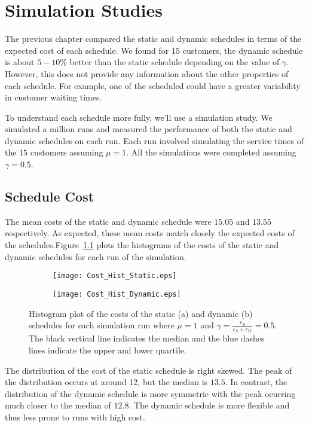 \chapter{Simulation Studies}
The previous chapter compared the static and dynamic schedules in terms of the expected cost of each schedule. We found for $15$ customers, the dynamic schedule is about $5 - 10 \%$ better than the static schedule depending on the value of $\gamma$. However, this does not provide any information about the other properties of each schedule. For example, one of the scheduled could have a greater variability in customer waiting times.

To understand each schedule more fully, we'll use a simulation study. We simulated a million runs and measured the performance of both the static and dynamic schedules on each run. Each run involved simulating the service times of the $15$ customers assuming $\mu = 1$. All the simulations were completed assuming $\gamma = 0.5$.

\section{Schedule Cost}
The mean costs of the static and dynamic schedule were $15.05$ and $13.55$ respectively. As expected, these mean costs match closely the expected costs of the schedules.Figure~\ref{fig:Two_Cost} plots the histograms of the costs of the static and dynamic schedules for each run of the simulation.
\begin{figure}[htb]
	\centering
	\begin{subfigure}[t]{0.45\textwidth}
		\centering
		\texttt{[image: Cost\_Hist\_Static.eps]}
		\caption{}
	\end{subfigure}
	\begin{subfigure}[t]{0.45\textwidth}
		\centering
		\texttt{[image: Cost\_Hist\_Dynamic.eps]}
		\caption{}
	\end{subfigure}
	\caption{Histogram plot of the costs of the static (a) and dynamic (b) schedules for each simulation run where $\mu = 1$ and $\gamma = \frac{c_{S}}{c_{S} + c_{W}} = 0.5$. The black vertical line indicates the median and the blue dashes lines indicate the upper and lower quartile.}
	\label{fig:Two_Cost}
\end{figure}

The distribution of the cost of the static schedule is right skewed. The peak of the distribution occurs at around 12, but the median is $13.5$. In contrast, the distribution of the dynamic schedule is more symmetric with the peak ocurring much closer to the median of $12.8$. The dynamic schedule is more flexible and thus less prone to runs with high cost.

